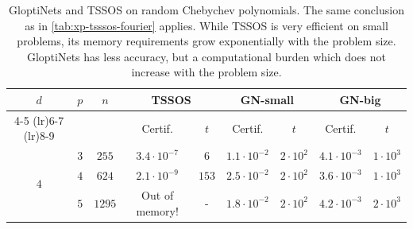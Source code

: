 \documentclass{article}
\begin{document}
\begin{table}
  \caption{GloptiNets and TSSOS on random Chebychev polynomials. The same conclusion as in \cref{tab:xp-tsssos-fourier} applies. While TSSOS is very efficient on small problems, its memory requirements grow exponentially with the problem size. GloptiNets has less accuracy, but a computational burden which does not increase with the problem size.}
  \label{tab:xp-tssos-cheby}
  \centering
  \begin{tabular}{*{9}{c}}
    \toprule
    \multirow{3}{*}{$d$}         &
    \multirow{3}{*}{$p$}         &
    \multirow{3}{*}{$n$}         &

    \multicolumn{2}{c}{TSSOS}    &
    \multicolumn{2}{c}{GN-small} & \multicolumn{2}{c}{GN-big}                                                                                                                      \\
    \cmidrule(lr){4-5}
    \cmidrule(lr){6-7}
    \cmidrule(lr){8-9}


                                 &                            &        & Certif.             & $t$   &
    Certif.                      & $t$                        &
    Certif.                      & $t$
    \\
    \midrule
    \multirow{3}{*}{$4$}         & $3$                        & $255$  & $3.4 \cdot 10^{-7}$ & $6$   & $1.1 \cdot 10^{-2}$ & $2 \cdot 10^2$ & $4.1 \cdot 10^{-3}$ & $1 \cdot 10^3$ \\
                                 & $4$                        & $624$  & $2.1 \cdot 10^{-9}$ & $153$ & $2.5 \cdot 10^{-2}$ & $2 \cdot 10^2$ & $3.6 \cdot 10^{-3}$ & $1 \cdot 10^3$ \\
                                 & $5$                        & $1295$ & Out of memory!      & -     & $1.8 \cdot 10^{-2}$ & $2 \cdot 10^2$ & $4.2 \cdot 10^{-3}$ & $2 \cdot 10^3$ \\

    \bottomrule
  \end{tabular}
\end{table}
\end{document}
